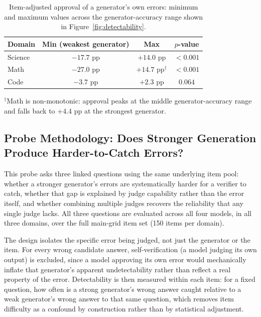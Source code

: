 \documentclass{article}
\begin{document}
\begin{table}[H]
\centering
\small
\caption{Item-adjusted approval of a generator's own errors: minimum and maximum
values across the generator-accuracy range shown in Figure~\ref{fig:detectability}.}
\label{tab:detect-range}
\begin{tabular}{lccc}
\toprule
Domain & Min (weakest generator) & Max & $p$-value \\
\midrule
Science & $-17.7$ pp & $+14.0$ pp & $<0.001$ \\
Math    & $-27.0$ pp & $+14.7$ pp$^\dagger$ & $<0.001$ \\
Code    & $-3.7$ pp  & $+2.3$ pp  & $0.064$ \\
\bottomrule
\end{tabular}
\vspace{2pt}
{\footnotesize $^\dagger$Math is non-monotonic: approval peaks at the middle
generator-accuracy range and falls back to $+4.4$ pp at the strongest generator.}
\end{table}

\subsection{Probe Methodology: Does Stronger Generation Produce Harder-to-Catch Errors?}

This probe asks three linked questions using the same underlying item pool: whether a
stronger generator's errors are systematically harder for a verifier to catch, whether
that gap is explained by judge capability rather than the error itself, and whether
combining multiple judges recovers the reliability that any single judge lacks. All
three questions are evaluated across all four models, in all three domains, over the
full main-grid item set (150 items per domain).

The design isolates the specific error being judged, not just the generator or the
item. For every wrong candidate answer, self-verification (a model judging its own
output) is excluded, since a model approving its own error would mechanically inflate
that generator's apparent undetectability rather than reflect a real property of the
error. Detectability is then measured within each item: for a fixed question, how
often is a strong generator's wrong answer caught relative to a weak generator's wrong
answer to that same question, which removes item difficulty as a confound by
construction rather than by statistical adjustment.
\end{document}
